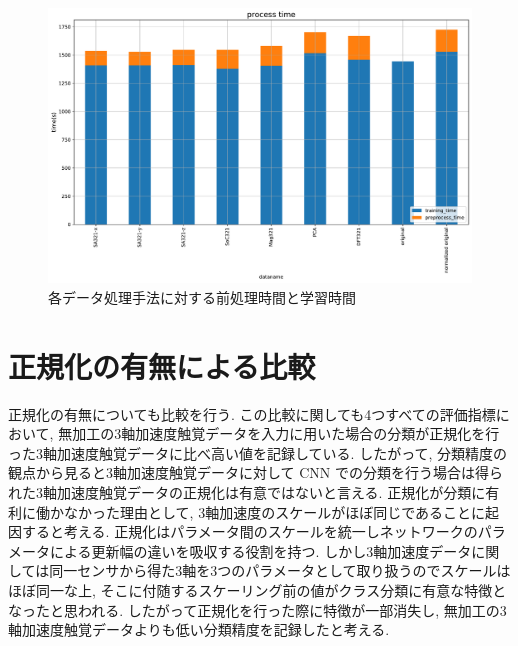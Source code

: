 \begin{figure}[H]
    \begin{center}
    \includegraphics[width=12cm]{eps/process_time.pdf}
    \caption{各データ処理手法に対する前処理時間と学習時間}
    \label{fig:process_time}
   \end{center}
   \end{figure}
   
\section{正規化の有無による比較}
正規化の有無についても比較を行う. この比較に関しても4つすべての評価指標において, 無加工の3軸加速度触覚データを入力に用いた場合の分類が正規化を行った3軸加速度触覚データに比べ高い値を記録している. 
したがって, 分類精度の観点から見ると3軸加速度触覚データに対して CNN での分類を行う場合は得られた3軸加速度触覚データの正規化は有意ではないと言える.
正規化が分類に有利に働かなかった理由として, 3軸加速度のスケールがほぼ同じであることに起因すると考える. 
正規化はパラメータ間のスケールを統一しネットワークのパラメータによる更新幅の違いを吸収する役割を持つ. 
しかし3軸加速度データに関しては同一センサから得た3軸を3つのパラメータとして取り扱うのでスケールはほぼ同一な上, そこに付随するスケーリング前の値がクラス分類に有意な特徴となったと思われる. 
したがって正規化を行った際に特徴が一部消失し, 無加工の3軸加速度触覚データよりも低い分類精度を記録したと考える. 
